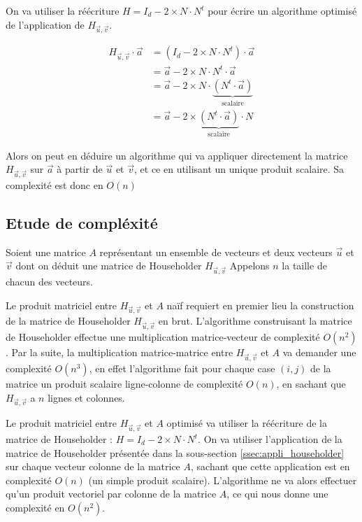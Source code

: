 \documentclass{article}
\begin{document}
On va utiliser la réécriture $H = I_d - 2 \times N \cdot N^t$ pour écrire un algorithme optimisé de l'application
de $H_{\vec{u},\vec{v}}$.

\begin{align}
  \label{eq:opti_app_hh}
  H_{\vec{u},\vec{v}} \cdot \vec{a} &= (I_d - 2 \times N \cdot N^t) \cdot \vec{a} \\
                                    &= \vec{a} - 2 \times N \cdot N^t \cdot \vec{a} \\
                                    &= \vec{a} - 2 \times N \cdot \underbrace{(N^t \cdot \vec{a})}_{\text{scalaire}} \\
                                    &= \vec{a} - 2 \times \underbrace{(N^t \cdot \vec{a})}_{\text{scalaire}} \cdot N
\end{align}

Alors on peut en déduire un algorithme qui va appliquer directement la matrice $H_{\vec{u},\vec{v}}$ sur $\vec{a}$ à
partir de $\vec{u}$ et $\vec{v}$, et ce en utilisant un unique produit scalaire. Sa complexité est donc en $O(n)$

\subsection{Etude de compléxité}
\label{ssec:complex_householder}

Soient une matrice $A$ représentant un ensemble de vecteurs et deux vecteurs $\vec{u}$ et $\vec{v}$ dont
on déduit une matrice de Householder $H_{\vec{u},\vec{v}}$
Appelons $n$ la taille de chacun des vecteurs. \newline

Le produit matriciel entre $H_{\vec{u},\vec{v}}$ et $A$ naïf requiert en premier lieu la construction de 
la matrice de Householder $H_{\vec{u},\vec{v}}$ en brut. L'algorithme construisant la matrice de Householder
effectue une multiplication matrice-vecteur de complexité $O(n^2)$. Par la suite, la multiplication matrice-matrice
entre $H_{\vec{u},\vec{v}}$ et $A$ va demander une complexité $O(n^3)$, en effet l'algorithme fait pour chaque
case $(i,j)$ de la matrice un produit scalaire ligne-colonne de complexité $O(n)$, en sachant que $H_{\vec{u},\vec{v}}$ a $n$ lignes
et colonnes.

Le produit matriciel entre $H_{\vec{u},\vec{v}}$ et $A$ optimisé va utiliser la réécriture de la matrice de Householder :
$H = I_d - 2 \times N \cdot N^t$. 
On va utiliser l'application de la matrice de Householder présentée dans la sous-section \ref{ssec:appli_householder} sur 
chaque vecteur colonne de la matrice $A$, sachant que cette application est en complexité $O(n)$ (un simple produit scalaire).
L'algorithme ne va alors effectuer qu'un produit vectoriel par colonne de la matrice $A$, ce qui nous donne une complexité en $O(n^2)$.
\end{document}
